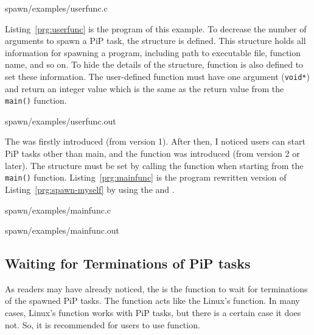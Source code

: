  {spawn/examples/userfunc.c}

Listing~\ref{prg:userfunc} is the program of this example. To decrease
the number of arguments to spawn a PiP task, the
 structure is defined. This structure
holds all information for spawning a program, including path to
executable file, function name, and so on. To hide the details of the
structure,  function is also defined
to set these information. The user-defined function must have one
argument ({\tt void*}) and return an integer value which is the same
as the return value from the {\tt main()} function.

 {spawn/examples/userfunc.out}

The  was firstly introduced (from version
1). After then, I noticed users can start PiP tasks other than main,
and the  function was
introduced (from version 2 or later). The
 structure must be set 
by calling the  function when
starting from the {\tt main()} function. Listing~\ref{prg:mainfunc} is
the program rewritten version of Listing~\ref{prg:spawn-myself} by
using the  and
.


                {spawn/examples/mainfunc.c}

 {spawn/examples/mainfunc.out}


\subsection{Waiting for Terminations of PiP tasks}

As readers may have already noticed, the  is the
function to wait for terminations of the spawned PiP tasks. The
 function acts like the Linux's 
function. In many cases, Linux's  function works
with PiP tasks, but there is a certain case it does not. So, it is
recommended for users to use  function.

